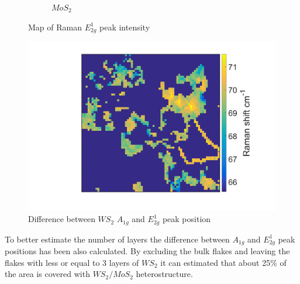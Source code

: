 \begin{figure}[h]
\begin{center}
\begin{subfigure}[b]{0.45\textwidth}
			\caption{$MoS_2$}
			\label{fig:HeterostructuresRamanIntensityEMoS2}
		\end{subfigure}
		\caption{Map of Raman $E^1_{2g}$ peak intensity}
		\label{fig:HeterostructuresRamanIntensityE}
	\end{center}
\end{figure}

\begin{figure}[h]
	\begin{center}
		\includegraphics[scale=0.3]{Heterostructures/HeterostructureRamanDifferenceW.png}
		\caption{Difference between $WS_2$ $A_{1g}$ and $E^1_{2g}$ peak position}
		\label{fig:HeterostructuresRamanDifferenceW}
	\end{center}
\end{figure}

To better estimate the number of layers the difference between $A_{1g}$ and $E^1_{2g}$ peak positions has been also calculated. By excluding the bulk flakes and leaving the flakes with less or equal to 3 layers of $WS_2$ it can estimated that about 25\% of the area is covered with $WS_2/MoS_2$ heterostructure.

